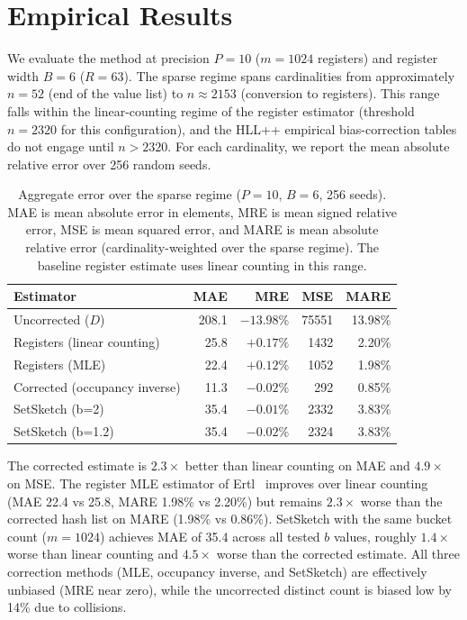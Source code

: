 \documentclass[11pt,letterpaper]{article}
\begin{document}
\section{Empirical Results}
\label{sec:results}

We evaluate the method at precision $P = 10$ ($m = 1024$ registers) and
register width $B = 6$ ($R = 63$). The sparse regime spans
cardinalities from approximately $n = 52$ (end of the value list) to
$n \approx 2153$ (conversion to registers). This range falls within the
linear-counting regime of the register estimator (threshold $n = 2320$
for this configuration), and the HLL++ empirical bias-correction tables
do not engage until $n > 2320$. For each cardinality, we report the
mean absolute relative error over 256 random seeds.

\begin{table}[t]
\centering
\caption{Aggregate error over the sparse regime ($P = 10$, $B = 6$,
256 seeds). MAE is mean absolute error in elements, MRE is mean
signed relative error, MSE is mean squared error, and MARE is mean
absolute relative error (cardinality-weighted over the sparse regime).
The baseline register estimate uses linear counting in this range.}
\label{tab:error}
\begin{tabular}{lrrrr}
\toprule
Estimator & MAE & MRE & MSE & MARE \\
\midrule
Uncorrected ($D$) & 208.1 & $-13.98\%$ & 75551 & 13.98\% \\
Registers (linear counting) & 25.8 & $+0.17\%$ & 1432 & 2.20\% \\
Registers (MLE) & 22.4 & $+0.12\%$ & 1052 & 1.98\% \\
Corrected (occupancy inverse) & 11.3 & $-0.02\%$ & 292 & 0.85\% \\
SetSketch (b=2) & 35.4 & $-0.01\%$ & 2332 & 3.83\% \\
SetSketch (b=1.2) & 35.4 & $-0.02\%$ & 2324 & 3.83\% \\
\bottomrule
\end{tabular}
\end{table}

The corrected estimate is $2.3\times$ better than linear counting on
MAE and $4.9\times$ on MSE. The register MLE estimator of
Ertl~\cite{ertl2017probabilistic} improves over linear counting
(MAE 22.4 vs 25.8, MARE 1.98\% vs 2.20\%) but remains $2.3\times$
worse than the corrected hash list on MARE (1.98\% vs 0.86\%).
SetSketch with the same bucket count ($m = 1024$) achieves MAE of
35.4 across all tested $b$ values, roughly $1.4\times$ worse than
linear counting and $4.5\times$ worse than the corrected estimate.
All three correction methods (MLE, occupancy inverse, and SetSketch)
are effectively unbiased (MRE near zero), while the uncorrected
distinct count is biased low by 14\% due to collisions.
\end{document}
